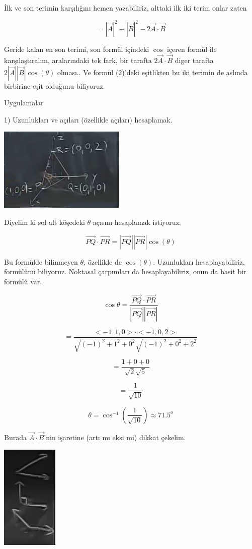 \documentclass[12pt,fleqn]{article}\usepackage{../../common}
\begin{document}
İlk ve son terimin karşılığını hemen yazabiliriz, alttaki ilk iki terim
onlar zaten

$$ = |\vec{A}|^2 + |\vec{B}|^2 - 2\vec{A} \cdot \vec{B} $$

Geride kalan en son terimi, son formül içindeki $\cos$ içeren formül ile
karşılaştıralım, aralarındaki tek fark, bir tarafta $2\vec{A} \cdot \vec{B}$
diger tarafta $2|\vec{A}||\vec{B}|\cos(\theta)$ olması.. Ve formül (2)'deki
eşitlikten bu iki terimin de aslında birbirine eşit olduğunu biliyoruz.

Uygulamalar

1) Uzunlukları ve açıları (özellikle açıları) hesaplamak.

\begin{center}
\includegraphics[height=4cm]{1_12.png}
\end{center}

Diyelim ki sol alt köşedeki $\theta$ açısını hesaplamak istiyoruz. 

$$ \vec{PQ} \cdot \vec{PR} = |\vec{PQ}||\vec{PR}|\cos(\theta)  $$

Bu formülde bilinmeyen $\theta$, özellikle de $\cos(\theta)$. Uzunlukları
hesaplayabiliriz, formülünü biliyoruz. Noktasal çarpımları da hesaplayabiliriz,
onun da basit bir formülü var.

$$ \cos\theta = \frac{\vec{PQ} \cdot \vec{PR}}{|\vec{PQ}||\vec{PR}|}$$

$$ = \frac{<-1,1,0>\cdot<-1,0,2>}
{  \sqrt{(-1)^2+1^2+0^2 }\sqrt{(-1)^2+0^2+2^2 }   } 
$$

$$ = \frac{1+0+0}{\sqrt{2}\sqrt{5}}  $$

$$ = \frac{1}{\sqrt{10}} $$

$$ \theta = \cos^{-1}(\frac{1}{\sqrt{10}}) \approx 71.5^o $$

Burada $\vec{A}\cdot\vec{B}$'nin işaretine (artı mı eksi mi) dikkat
çekelim. 

\begin{center}
\includegraphics[height=5cm]{1_13.png}
\end{center}
\end{document}
